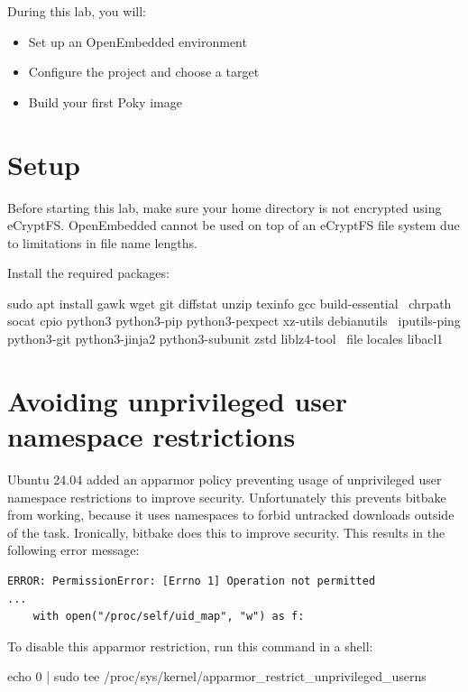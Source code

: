 
During this lab, you will:
\begin{itemize}
  \item Set up an OpenEmbedded environment
  \item Configure the project and choose a target
  \item Build your first Poky image
\end{itemize}

\section{Setup}

Before starting this lab, make sure your home directory is not
encrypted using eCryptFS. OpenEmbedded cannot be used on top of an eCryptFS file
system due to limitations in file name lengths.

Install the required packages:
\begin{bashinput}
sudo apt install gawk wget git diffstat unzip texinfo gcc build-essential \
  chrpath socat cpio python3 python3-pip python3-pexpect xz-utils debianutils \
  iputils-ping python3-git python3-jinja2 python3-subunit zstd liblz4-tool \
  file locales libacl1
\end{bashinput}

\section{Avoiding unprivileged user namespace restrictions}

Ubuntu 24.04 added an apparmor policy preventing usage of unprivileged user
namespace restrictions to improve security. Unfortunately this prevents
bitbake from working, because it uses namespaces to forbid untracked
downloads outside of the \code{do_fetch} task. Ironically, bitbake does
this to improve security. This results in the following error message:

\begin{verbatim}
ERROR: PermissionError: [Errno 1] Operation not permitted
...
    with open("/proc/self/uid_map", "w") as f:
\end{verbatim}

To disable this apparmor restriction, run this command in a shell:

\begin{bashinput}
echo 0 | sudo tee /proc/sys/kernel/apparmor_restrict_unprivileged_userns
\end{bashinput}

